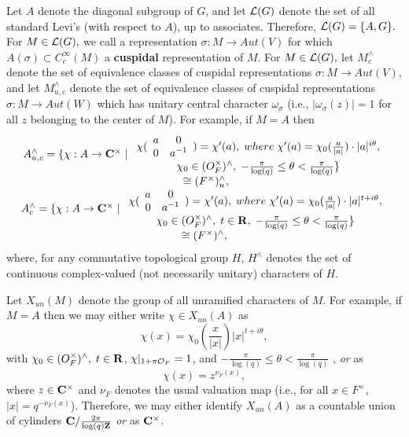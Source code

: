 Let $A$ denote the diagonal subgroup of $G$, and let ${\cal L}(G)$ denote
the set of all standard Levi's (with respect to $A$), up to associates.
Therefore, ${\cal L}(G)=\{A,G\}.$ For $M\in {\cal L}(G),\;$we call a
representation $\sigma :M\rightarrow Aut(V)$ for which $A(\sigma )\subset
C_c^\infty (M)$ a {\bf cuspidal} representation of $M$. For $M\in {\cal L}%
(G),\;$let $M_c^{\wedge }$ denote the set of equivalence classes of cuspidal
representations $\sigma :M\rightarrow Aut(V)$, and let $M_{u,c}^{\wedge }$
denote the set of equivalence classes of cuspidal representations $\sigma
:M\rightarrow Aut(W)$ which has unitary central character $\omega _\sigma $
(i.e., $|\omega _\sigma (z)|=1$ for all $z$ belonging to the center of $M$).
For example, if $M=A$ then 
\[
\begin{array}{c}
A_{u,c}^{\wedge }=\{\chi :A\rightarrow {\bf C}^{\times }\;|\; 
\begin{array}{c}
\chi ( 
\begin{array}{cc}
a & 0 \\ 
0 & a^{-1}
\end{array}
)=\chi ^{\prime }(a),\;where\;\chi ^{\prime }(a)=\chi _0(\frac a{|a|})\cdot
|a|^{i\theta }, \\ 
\chi _0\in (O_F^{\times })^{\wedge },\;-\frac \pi {\log (q)}\leq \theta
<\frac \pi {\log (q)}\}
\end{array}
\\ 
\;\cong (F^{\times })_u^{\wedge }, \\ 
A_c^{\wedge }=\{\chi :A\rightarrow {\bf C}^{\times }\;|\; 
\begin{array}{c}
\chi ( 
\begin{array}{cc}
a & 0 \\ 
0 & a^{-1}
\end{array}
)=\chi ^{\prime }(a),\;where\;\chi ^{\prime }(a)=\chi _0(\frac a{|a|})\cdot
|a|^{t+i\theta }, \\ 
\chi _0\in (O_F^{\times })^{\wedge },\;t\in {\bf R},\;-\frac \pi {\log
(q)}\leq \theta <\frac \pi {\log (q)}\}
\end{array}
\\ 
\cong (F^{\times })^{\wedge },
\end{array}
\]
where, for any commutative topological group $H$, $H^{\wedge }$ denotes the
set of continuous complex-valued (not necessarily unitary) characters of $H$.

Let $X_{un}(M)$ denote the group of all unramified characters of $M$. For
example, if $M=A$ then we may either write $\chi \in X_{un}(A)$ as 
\[
\chi (x)=\chi _0({\frac x{|x|}})|x|^{t+i\theta }, 
\]
with $\chi _0\in (O_F^{\times })^{\wedge },\;t\in {\bf R}$, $\chi |_{1+\pi 
{\cal O}_F}=1$, and $-\frac \pi {\log (q)}\leq \theta <\frac \pi {\log (q)}$%
, {\em or} as 
\[
\chi (x)=z^{\nu _F(x)}, 
\]
where $z\in {\bf C}^{\times }$ and $\nu _F$ denotes the usual valuation map
(i.e., for all $x\in F^{\times }$, $|x|=q^{-\nu _F(x)}$). Therefore, we may
either identify $X_{un}(A)$ as a countable union of cylinders ${\bf C}/{%
\frac{2\pi }{\log (q){\bf Z}}}$ {\em or} as ${\bf C}^{\times }$.

